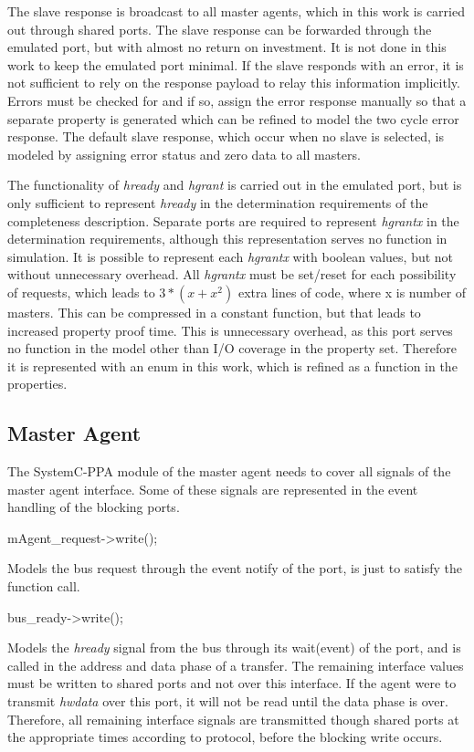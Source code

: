 The slave response is broadcast to all master agents, which in this work is carried out through shared ports. The slave response can be forwarded through the emulated port, but with almost no return on investment. It is not done in this work to keep the emulated port minimal. If the slave responds with an error, it is not sufficient to rely on the response payload to relay this information implicitly. Errors must be checked for and if so, assign the error response manually so that a separate property is generated which can be refined to model the two cycle error response. The default slave response, which occur when no slave is selected, is modeled by assigning error status and zero data to all masters.\par
The functionality of \textit{hready} and \textit{hgrant} is carried out in the emulated port, but is only sufficient to represent \textit{hready} in the determination requirements of the completeness description. Separate ports are required to represent \textit{hgrantx} in the determination requirements, although this representation serves no function in simulation. It is possible to represent each \textit{hgrantx} with boolean values, but not without unnecessary overhead. All \textit{hgrantx} must be set/reset for each possibility of requests, which leads to $3*(x+x^2)$ extra lines of code, where x is number of masters. This can be compressed in a constant function, but that leads to increased property proof time. This is unnecessary overhead, as this port serves no function in the model other than I/O coverage in the property set. Therefore it is represented with an enum in this work, which is refined as a function in the properties. \par
{} 
 

\subsection{Master Agent}
The SystemC-PPA module of the master agent needs to cover all signals of the master agent interface. Some of these signals are represented in the event handling of the blocking ports. \par
mAgent\_request->write(); \par
Models the bus request through the event notify of the port,  is just to satisfy the function call. \par
bus\_ready->write(); \par
Models the \textit{hready} signal from the bus through its wait(event) of the port, and is called in the address and data phase of a transfer. The remaining interface values must be written to shared ports and not over this interface. If the agent were to transmit \textit{hwdata} over this port, it will not be read until the data phase is over. Therefore, all remaining interface signals are transmitted though shared ports at the appropriate times according to protocol, before the blocking write occurs.  
 
